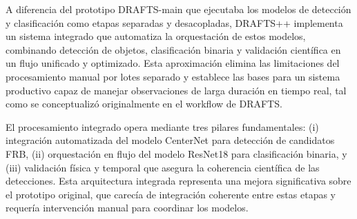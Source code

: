 A diferencia del prototipo DRAFTS-main que ejecutaba los modelos de detección y clasificación como etapas separadas y desacopladas, DRAFTS++ implementa un sistema integrado que automatiza la orquestación de estos modelos, combinando detección de objetos, clasificación binaria y validación científica en un flujo unificado y optimizado. Esta aproximación elimina las limitaciones del procesamiento manual por lotes separado y establece las bases para un sistema productivo capaz de manejar observaciones de larga duración en tiempo real, tal como se conceptualizó originalmente en el workflow de DRAFTS.

El procesamiento integrado opera mediante tres pilares fundamentales: (i) integración automatizada del modelo CenterNet para detección de candidatos FRB, (ii) orquestación en flujo del modelo ResNet18 para clasificación binaria, y (iii) validación física y temporal que asegura la coherencia científica de las detecciones. Esta arquitectura integrada representa una mejora significativa sobre el prototipo original, que carecía de integración coherente entre estas etapas y requería intervención manual para coordinar los modelos.

